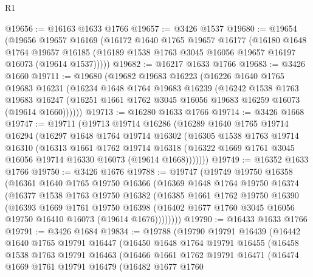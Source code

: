\begin{lexlean}{R1}
\begin{coremodule}
@19656 := @16163 @1633 @1766
@19657 := @3426 @1537
@19680 := @19654
    (@19656
      @19657
      @16169
      (@16172
        @1640
        @1765
        @19657
        @16177
        (@16180
          @1648
          @1764
          @19657
          @16185
          (@16189 @1538 @1763 @3045 @16056 @19657 @16197 @16073 (@19614 @1537)))))
@19682 := @16217 @1633 @1766
@19683 := @3426 @1660
@19711 := @19680
    (@19682
      @19683
      @16223
      (@16226
        @1640
        @1765
        @19683
        @16231
        (@16234
          @1648
          @1764
          @19683
          @16239
          (@16242
            @1538
            @1763
            @19683
            @16247
            (@16251 @1661 @1762 @3045 @16056 @19683 @16259 @16073 (@19614 @1660))))))
@19713 := @16280 @1633 @1766
@19714 := @3426 @1668
@19747 := @19711
    (@19713
      @19714
      @16286
      (@16289
        @1640
        @1765
        @19714
        @16294
        (@16297
          @1648
          @1764
          @19714
          @16302
          (@16305
            @1538
            @1763
            @19714
            @16310
            (@16313
              @1661
              @1762
              @19714
              @16318
              (@16322 @1669 @1761 @3045 @16056 @19714 @16330 @16073 (@19614 @1668)))))))
@19749 := @16352 @1633 @1766
@19750 := @3426 @1676
@19788 := @19747
    (@19749
      @19750
      @16358
      (@16361
        @1640
        @1765
        @19750
        @16366
        (@16369
          @1648
          @1764
          @19750
          @16374
          (@16377
            @1538
            @1763
            @19750
            @16382
            (@16385
              @1661
              @1762
              @19750
              @16390
              (@16393
                @1669
                @1761
                @19750
                @16398
                (@16402 @1677 @1760 @3045 @16056 @19750 @16410 @16073 (@19614 @1676))))))))
@19790 := @16433 @1633 @1766
@19791 := @3426 @1684
@19834 := @19788
    (@19790
      @19791
      @16439
      (@16442
        @1640
        @1765
        @19791
        @16447
        (@16450
          @1648
          @1764
          @19791
          @16455
          (@16458
            @1538
            @1763
            @19791
            @16463
            (@16466
              @1661
              @1762
              @19791
              @16471
              (@16474
                @1669
                @1761
                @19791
                @16479
                (@16482
                  @1677
                  @1760

\end{coremodule}
\end{lexlean}
